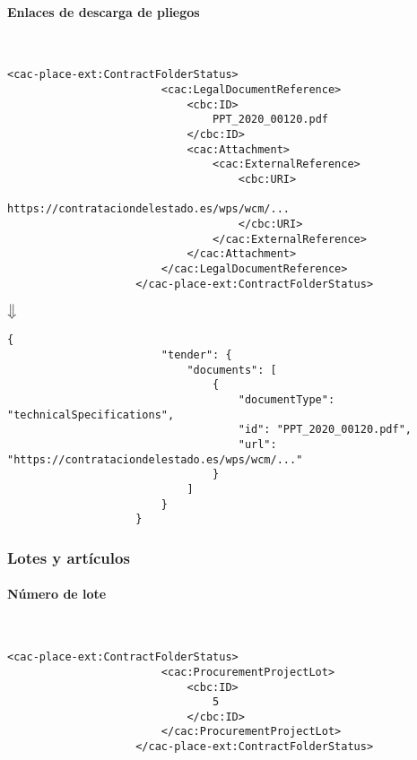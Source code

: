             \paragraph{Enlaces de descarga de pliegos} \mbox{}\\
                \begin{lstlisting}[language=lXML]
                    <cac-place-ext:ContractFolderStatus>
                        <cac:LegalDocumentReference>
                            <cbc:ID>
                                PPT_2020_00120.pdf
                            </cbc:ID>
                            <cac:Attachment>
                                <cac:ExternalReference>
                                    <cbc:URI>
                                        https://contrataciondelestado.es/wps/wcm/...
                                    </cbc:URI>
                                </cac:ExternalReference>
                            </cac:Attachment>
                        </cac:LegalDocumentReference>
                    </cac-place-ext:ContractFolderStatus>
                \end{lstlisting}
                
                \begin{center}
                    $\big\Downarrow$
                \end{center}
                
                \begin{lstlisting}[language=lJSON]
                    {
                        "tender": {
                            "documents": [
                                {
                                    "documentType": "technicalSpecifications",
                                    "id": "PPT_2020_00120.pdf",
                                    "url": "https://contrataciondelestado.es/wps/wcm/..."
                                }
                            ]
                        }
                    }
                \end{lstlisting}
                
        \subsubsection{Lotes y artículos}
            \paragraph{Número de lote} \mbox{}\\
                \begin{lstlisting}[language=lXML]
                    <cac-place-ext:ContractFolderStatus>
                        <cac:ProcurementProjectLot>
                            <cbc:ID>
                                5
                            </cbc:ID>
                        </cac:ProcurementProjectLot>
                    </cac-place-ext:ContractFolderStatus>
                \end{lstlisting}
                
